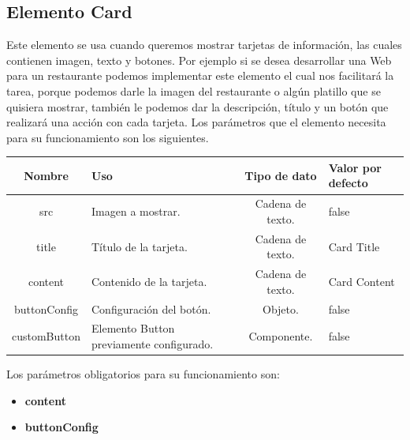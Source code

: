     \subsection{Elemento Card}
    Este elemento se usa cuando queremos mostrar tarjetas de información, las cuales contienen imagen, texto y botones. Por ejemplo si se desea desarrollar una Web para un restaurante podemos implementar este elemento el cual nos facilitará la tarea, porque podemos darle la imagen del restaurante o algún platillo que se quisiera mostrar, también le podemos dar la descripción, título y un botón que realizará una acción con cada tarjeta.
Los parámetros que el elemento necesita para su funcionamiento son los siguientes.
\newline
    \newline
    \begin{center}
     \begin{tabular}{ | c |  p{5cm}  | c | p{3cm} |} 
     \hline
     \textbf{Nombre} &  \textbf{Uso} &  \textbf{ Tipo de dato} &  \textbf{Valor por defecto}\\ [0.5ex] 
     \hline\hline
     src &  Imagen a mostrar. &   Cadena de texto. &  false \\  [2.5ex] 
     \hline
      title & Título de la tarjeta. &   Cadena de texto. &  Card Title \\  [2.5ex] 
     \hline
     content & Contenido de la tarjeta. &   Cadena de texto. &  Card Content  \\  [2.5ex] 
     \hline
     buttonConfig &  Configuración del botón. &   Objeto. &  false \\  [2.5ex] 
     \hline
     customButton &  Elemento Button previamente configurado. &   Componente. &  false \\  [2.5ex] 
     \hline
    \end{tabular}
    \end{center}
    \newline
            \newline
Los parámetros obligatorios para su funcionamiento son:
\begin{itemize}
\item \textbf{content} 
\item \textbf{buttonConfig} 
\end{itemize}
\newline
    \newline
